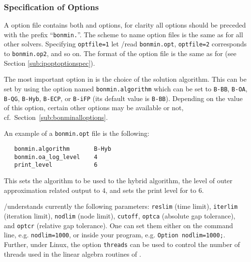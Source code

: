 \subsubsection{Specification of Options}

A \BONMIN option file contains both \IPOPT and \BONMIN options, for clarity all \BONMIN options should be preceded with the prefix ``\texttt{bonmin.}''. %
The scheme to name option files is the same as for all other \GAMS solvers.
Specifying \texttt{optfile=1} let \GAMS/\BONMIN read \texttt{bonmin.opt}, \texttt{optfile=2} corresponds to \texttt{bonmin.op2}, and so on.
The format of the option file is the same as for \IPOPT (see Section \ref{sub:ipoptoptionspec}).

The most important option in \BONMIN is the choice of the solution algorithm.
This can be set by using the option named \texttt{bonmin.algorithm} which can be set to \texttt{B-BB}, \texttt{B-OA}, \texttt{B-QG}, \texttt{B-Hyb}, \texttt{B-ECP}, or \texttt{B-iFP} (its default value is \texttt{B-BB}).
Depending on the value of this option, certain other options may be available or not, cf.\ Section~\ref{sub:bonminalloptions}.

An example of a \texttt{bonmin.opt} file is the following:
\begin{verbatim}
   bonmin.algorithm       B-Hyb
   bonmin.oa_log_level    4
   print_level            6
\end{verbatim}
This sets the algorithm to be used to the hybrid algorithm, the level of outer approximation related output to $4$,
and sets the print level for \IPOPT to $6$.

\GAMS/\BONMIN understands currently the following \GAMS parameters: \texttt{reslim} (time limit), \texttt{iterlim} (iteration limit), \texttt{nodlim} (node limit), \texttt{cutoff}, \texttt{optca} (absolute gap tolerance), and \texttt{optcr} (relative gap tolerance).
One can set them either on the command line, e.g. \verb+nodlim=1000+, or inside your \GAMS program, e.g. \verb+Option nodlim=1000;+.
Further, under Linux, the option \texttt{threads} can be used to control the number of threads used in the linear algebra routines of \IPOPT.

